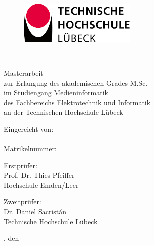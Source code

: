 \begin{titlepage}

\begin{center}

\begin{figure}[tbh]
 \centering
 \includegraphics[width=0.5\textwidth]{images/th-logo.png}
\end{figure}

\vspace{1.cm}

{
 \fontsize{20}{28}\selectfont
 \myTitle\\[0.5cm]
}

\fontsize{12}{12}\selectfont

\vspace{1.cm}

Masterarbeit\\
zur Erlangung des akademischen Grades M.Sc.\\
im Studiengang Medieninformatik\\
des Fachbereichs Elektrotechnik und Informatik\\
an der Technischen Hochschule Lübeck

\vspace{0.5cm}

Eingereicht von:\\
\myAuthor\\
Matrikelnummer: \myMatrikelnummer

\vspace{0.5cm}

Erstprüfer:\\
Prof. Dr. Thies Pfeiffer\\
Hochschule Emden/Leer\\


\vspace{.2cm}

Zweitprüfer:\\
Dr. Daniel Sacristán\\
Technische Hochschule Lübeck\\


\vspace{0.5cm}

\myOrt, den \myDate

\end{center}
\end{titlepage}

